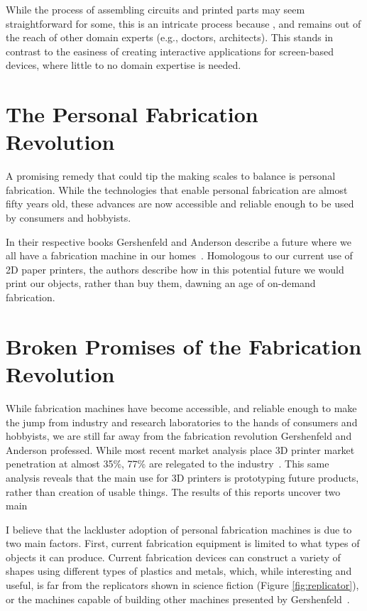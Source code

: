     While the process of assembling circuits and printed parts may seem
    straightforward for some, this is an intricate process because
    , and remains out of the reach of other domain experts (e.g.,
    doctors, architects). This stands in contrast to the easiness of creating
    interactive applications for screen-based devices, where little to no domain
    expertise is needed.
   
  \section{The Personal Fabrication Revolution} \label{sec:fab-revolution}
    A promising remedy that could tip the making scales to balance is
    personal fabrication. While the technologies that enable personal
    fabrication  are almost fifty years old, these advances are
    now accessible and reliable enough to be used by consumers and hobbyists.

    In their respective books Gershenfeld and Anderson describe a future where
    we all have a fabrication machine in our homes~\cite{Gershenfeld:2005,
    Anderson:2012}.  Homologous to our current use of 2D paper printers, the
    authors describe how in this potential future we would print our objects,
    rather than buy them, dawning an age of on-demand fabrication.

  \section{Broken Promises of the Fabrication Revolution} \label{sec:broken-promises}
    While fabrication machines have become accessible, and reliable enough to
    make the jump from industry and research laboratories to the hands of
    consumers and hobbyists, we are still far away from the fabrication
    revolution Gershenfeld and Anderson professed. While most recent market
    analysis place 3D printer market penetration at almost 35\%, 77\% are
    relegated to the industry~\cite{}. This same analysis reveals that the main
    use for 3D printers is prototyping future products, rather than creation of
    usable things. The results of this reports uncover two main

    I believe that the lackluster adoption of personal fabrication machines is
    due to two main factors. First, current fabrication equipment is limited to
    what types of objects it can produce. Current fabrication devices can
    construct a variety of shapes using different types of plastics and metals,
    which, while interesting and useful, is far from the replicators shown in
    science fiction (Figure \ref{fig:replicator}), or the machines capable of
    building other machines presented by Gershenfeld~\cite{Gershenfeld:2005}.

